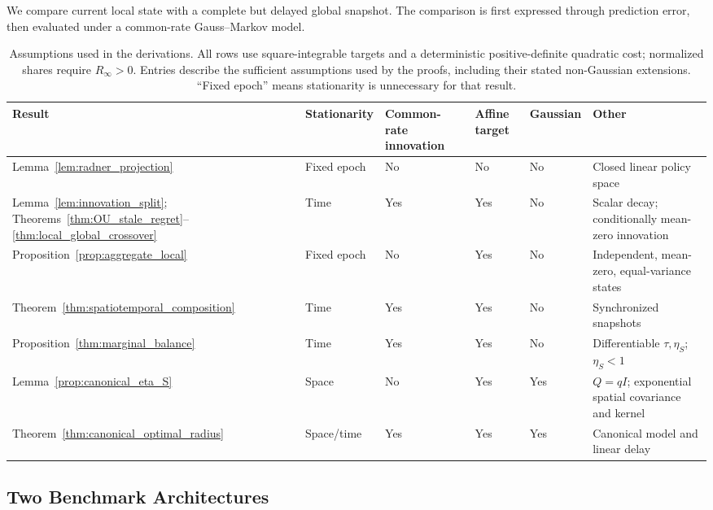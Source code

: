 \documentclass[11pt]{article}
\begin{document}
We compare current local state with a complete but delayed global snapshot.
The comparison is first expressed through prediction error, then evaluated
under a common-rate Gauss--Markov model.

\begin{table}[htbp]
\centering\small
\setlength{\tabcolsep}{3pt}
\caption{Assumptions used in the derivations. All rows use square-integrable
targets and a deterministic positive-definite quadratic cost; normalized shares
require $R_\infty>0$. Entries describe the sufficient assumptions used by the
proofs, including their stated non-Gaussian extensions. ``Fixed epoch'' means
stationarity is unnecessary for that result.}
\label{tab:result-assumptions}
\begin{tabular}{@{}>{\raggedright\arraybackslash}p{.23\linewidth}>{\raggedright\arraybackslash}p{.12\linewidth}>{\raggedright\arraybackslash}p{.13\linewidth}>{\centering\arraybackslash}p{.095\linewidth}>{\centering\arraybackslash}p{.085\linewidth}>{\raggedright\arraybackslash}p{.275\linewidth}@{}}
\toprule
Result & Stationarity & Common-rate innovation & Affine target & Gaussian & Other \\
\midrule
Lemma~\ref{lem:radner_projection}
 & Fixed epoch & No & No & No & Closed linear policy space \\
Lemma~\ref{lem:innovation_split}; Theorems~\ref{thm:OU_stale_regret}--\ref{thm:local_global_crossover}
 & Time & Yes & Yes & No & Scalar decay; conditionally mean-zero innovation \\
Proposition~\ref{prop:aggregate_local}
 & Fixed epoch & No & Yes & No & Independent, mean-zero, equal-variance states \\
Theorem~\ref{thm:spatiotemporal_composition}
 & Time & Yes & Yes & No & Synchronized snapshots \\
Proposition~\ref{thm:marginal_balance}
 & Time & Yes & Yes & No & Differentiable $\tau,\eta_S$; $\eta_S<1$ \\
Lemma~\ref{prop:canonical_eta_S}
 & Space & No & Yes & Yes & $Q=qI$; exponential spatial covariance and kernel \\
Theorem~\ref{thm:canonical_optimal_radius}
 & Space/time & Yes & Yes & Yes & Canonical model and linear delay \\
\bottomrule
\end{tabular}
\end{table}

\subsection{Two Benchmark Architectures}
\label{subsec:two_architectures}
\end{document}
